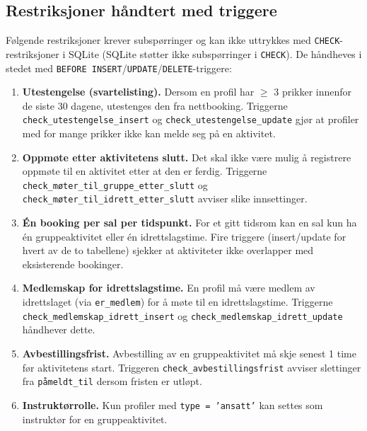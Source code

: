 \subsection{Restriksjoner håndtert med triggere}

Følgende restriksjoner krever subspørringer og kan ikke uttrykkes med
\texttt{CHECK}-restriksjoner i SQLite (SQLite støtter ikke subspørringer i
\texttt{CHECK}). De håndheves i stedet med \texttt{BEFORE INSERT}/\texttt{UPDATE}/\texttt{DELETE}-triggere:

\begin{enumerate}
    \item \textbf{Utestengelse (svartelisting).}
    Dersom en profil har $\geq$ 3 prikker innenfor de siste 30 dagene,
    utestenges den fra nettbooking. Triggerne \texttt{check\_utestengelse\_insert}
    og \texttt{check\_utestengelse\_update}
    gjør at profiler med for mange prikker ikke kan melde seg på en aktivitet.

    \item \textbf{Oppmøte etter aktivitetens slutt.}
    Det skal ikke være mulig å registrere oppmøte til en aktivitet etter at
    den er ferdig. Triggerne \texttt{check\_møter\_til\_gruppe\_etter\_slutt} og
    \texttt{check\_møter\_til\_idrett\_etter\_slutt} avviser slike innsettinger.

    \item \textbf{Én booking per sal per tidspunkt.}
    For et gitt tidsrom kan en sal kun ha én gruppeaktivitet eller én
    idrettslagstime. Fire triggere (insert/update for hvert av de to tabellene)
    sjekker at aktiviteter ikke overlapper med eksisterende bookinger.

    \item \textbf{Medlemskap for idrettslagstime.}
    En profil må være medlem av idrettslaget (via \texttt{er\_medlem}) for å
    møte til en idrettslagstime. Triggerne \texttt{check\_medlemskap\_idrett\_insert}
    og \texttt{check\_medlemskap\_idrett\_update} håndhever dette.

    \item \textbf{Avbestillingsfrist.}
    Avbestilling av en gruppeaktivitet må skje senest 1 time før aktivitetens
    start. Triggeren \texttt{check\_avbestillingsfrist} avviser slettinger fra
    \texttt{påmeldt\_til} dersom fristen er utløpt.

    \item \textbf{Instruktørrolle.}
    Kun profiler med \texttt{type = 'ansatt'} kan settes som instruktør for
    en gruppeaktivitet.


\end{enumerate}
